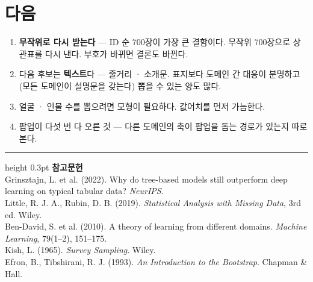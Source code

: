 \documentclass[10pt]{article}
\begin{document}
\section{다음}

\begin{enumerate}[leftmargin=1.3em,itemsep=0.15em]
\item \textbf{무작위로 다시 받는다} --- ID 순 700장이 가장 큰 결함이다. 무작위
      700장으로 상관표를 다시 낸다. 부호가 바뀌면 결론도 바뀐다.
\item 다음 후보는 \textbf{텍스트}다 --- 줄거리 · 소개문. 표지보다 도메인 간
      대응이 분명하고(모든 도메인이 설명문을 갖는다) 뽑을 수 있는 양도 많다.
\item 얼굴 · 인물 수를 뽑으려면 모형이 필요하다. 값어치를 먼저 가늠한다.
\item 팝업이 다섯 번 다 오른 것 --- 다른 도메인의 축이 팝업을 돕는 경로가
      있는지 따로 본다.
\end{enumerate}

\vspace{0.6em}
\hrule height 0.3pt
\vspace{0.5em}
{\footnotesize
\textbf{참고문헌}\\[0.3em]
Grinsztajn, L. et al. (2022). Why do tree-based models still outperform deep
learning on typical tabular data? \emph{NeurIPS}.\\[0.15em]
Little, R. J. A., Rubin, D. B. (2019). \emph{Statistical Analysis with Missing
Data}, 3rd ed. Wiley.\\[0.15em]
Ben-David, S. et al. (2010). A theory of learning from different domains.
\emph{Machine Learning}, 79(1--2), 151--175.\\[0.15em]
Kish, L. (1965). \emph{Survey Sampling}. Wiley.\\[0.15em]
Efron, B., Tibshirani, R. J. (1993). \emph{An Introduction to the Bootstrap}.
Chapman \& Hall.
}
\end{document}
